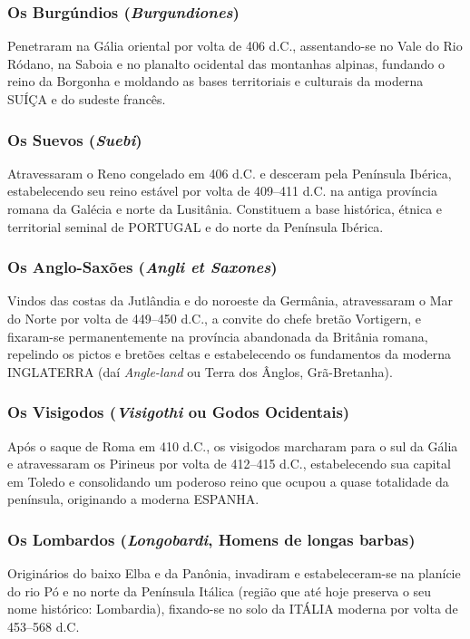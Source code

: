\documentclass[11pt,a4paper,openany]{book}
\begin{document}
\subsubsection*{Os Burgúndios (\textit{Burgundiones})}
Penetraram na Gália oriental por volta de 406 d.C., assentando-se no Vale do Rio Ródano, na Saboia e no planalto ocidental das montanhas alpinas, fundando o reino da Borgonha e moldando as bases territoriais e culturais da moderna SUÍÇA e do sudeste francês.


\subsubsection*{Os Suevos (\textit{Suebi})}
Atravessaram o Reno congelado em 406 d.C. e desceram pela Península Ibérica, estabelecendo seu reino estável por volta de 409–411 d.C. na antiga província romana da Galécia e norte da Lusitânia. Constituem a base histórica, étnica e territorial seminal de PORTUGAL e do norte da Península Ibérica.


\subsubsection*{Os Anglo-Saxões (\textit{Angli et Saxones})}
Vindos das costas da Jutlândia e do noroeste da Germânia, atravessaram o Mar do Norte por volta de 449–450 d.C., a convite do chefe bretão Vortigern, e fixaram-se permanentemente na província abandonada da Britânia romana, repelindo os pictos e bretões celtas e estabelecendo os fundamentos da moderna INGLATERRA (daí \textit{Angle-land} ou Terra dos Ânglos, Grã-Bretanha).


\subsubsection*{Os Visigodos (\textit{Visigothi} ou Godos Ocidentais)}
Após o saque de Roma em 410 d.C., os visigodos marcharam para o sul da Gália e atravessaram os Pirineus por volta de 412–415 d.C., estabelecendo sua capital em Toledo e consolidando um poderoso reino que ocupou a quase totalidade da península, originando a moderna ESPANHA.


\subsubsection*{Os Lombardos (\textit{Longobardi}, Homens de longas barbas)}
Originários do baixo Elba e da Panônia, invadiram e estabeleceram-se na planície do rio Pó e no norte da Península Itálica (região que até hoje preserva o seu nome histórico: Lombardia), fixando-se no solo da ITÁLIA moderna por volta de 453–568 d.C.
\end{document}
